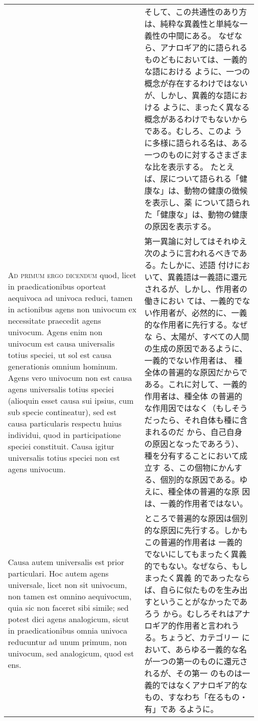 \documentclass[paper=a4paper,fontsize=10pt,jafontsize=9pt,titlepage]{jlreq}
\begin{document}
\begin{longtable}{p{21em}p{21em}}
&

そして、この共通性のあり方は、純粋な異義性と単純な一義性の中間にある。
なぜなら、アナロギア的に語られるものどもにおいては、一義的な語における
ように、一つの概念が存在するわけではないが、しかし、異義的な語における
ように、まったく異なる概念があるわけでもないからである。むしろ、このよ
うに多様に語られる名は、ある一つのものに対するさまざまな比を表示する。
たとえば、尿について語られる「健康な」は、動物の健康の徴候を表示し、薬
について語られた「健康な」は、動物の健康の原因を表示する。

\\

{\scshape Ad primum ergo dicendum} quod, licet in praedicationibus oporteat
aequivoca ad univoca reduci, tamen in actionibus agens non univocum ex
necessitate praecedit agens univocum. Agens enim non univocum est
causa universalis totius speciei, ut sol est causa generationis omnium
hominum. Agens vero univocum non est causa agens universalis totius
speciei (alioquin esset causa sui ipsius, cum sub specie contineatur),
sed est causa particularis respectu huius individui, quod in
participatione speciei constituit.  Causa igitur universalis totius
speciei non est agens univocum.

&

第一異論に対してはそれゆえ次のように言われるべきである。たしかに、述語
付けにおいて、異義語は一義語に還元されるが、しかし、作用者の働きにおい
ては、一義的でない作用者が、必然的に、一義的な作用者に先行する。なぜな
ら、太陽が、すべての人間の生成の原因であるように、一義的でない作用者は、
種全体の普遍的な原因だからである。これに対して、一義的作用者は、種全体
の普遍的な作用因ではなく（もしそうだったら、それ自体も種に含まれるのだ
から、自己自身の原因となったであろう）、種を分有することにおいて成立す
る、この個物にかんする、個別的な原因である。ゆえに、種全体の普遍的な原
因は、一義的作用者ではない。

\\

Causa autem universalis est prior particulari. Hoc autem agens
universale, licet non sit univocum, non tamen est omnino aequivocum,
quia sic non faceret sibi simile; sed potest dici agens analogicum,
sicut in praedicationibus omnia univoca reducuntur ad unum primum, non
univocum, sed analogicum, quod est ens.

&

ところで普遍的な原因は個別的な原因に先行する。しかもこの普遍的作用者は
一義的でないにしてもまったく異義的でもない。なぜなら、もしまったく異義
的であったならば、自らに似たものを生み出すということがなかったであろう
から。むしろそれはアナロギア的作用者と言われうる。ちょうど、カテゴリー
において、あらゆる一義的な名が一つの第一のものに還元されるが、その第一
のものは一義的ではなくアナロギア的なもの、すなわち「在るもの・有」であ
るように。


\end{longtable}
\end{document}

